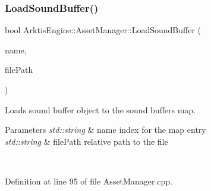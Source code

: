 \begin{DoxyCode}{0}

\end{DoxyCode}
\mbox{\label{class_arktis_engine_1_1_asset_manager_ad056af109292cee56e6506c597562d80}} 
\subsubsection{\texorpdfstring{LoadSoundBuffer()}{LoadSoundBuffer()}}
{\footnotesize\ttfamily bool Arktis\+Engine\+::\+Asset\+Manager\+::\+Load\+Sound\+Buffer (\begin{DoxyParamCaption}\item[{std\+::string}]{name,  }\item[{std\+::string}]{file\+Path }\end{DoxyParamCaption})}



Loads sound buffer object to the sound buffers map. 


\begin{DoxyParams}{Parameters}
{\em std\+::string} & name index for the map entry\\
\hline
{\em std\+::string} & file\+Path relative path to the file \begin{DoxyVerb}\end{DoxyVerb}
 \\
\hline
\end{DoxyParams}


Definition at line 95 of file Asset\+Manager.\+cpp.


